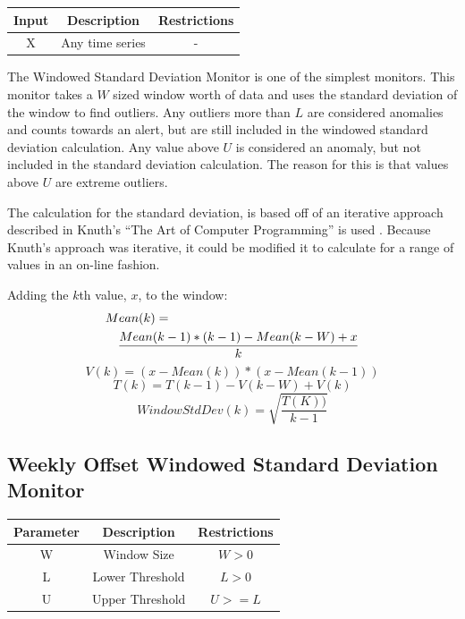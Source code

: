 \documentclass[12pt]{ucthesis}
\begin{document}
\begin{table}[H]
   \begin{center}
      \begin{tabular}{|c|c|c|}
         \hline
            Input & Description & Restrictions \\
         \hline
            X & Any time series & - \\
         \hline
      \end{tabular}
   \end{center}
\end{table}

The Windowed Standard Deviation Monitor is one of the simplest monitors. This monitor takes a $W$ sized window worth of data
and uses the standard deviation of the window to find outliers. Any outliers more than $L$ are considered anomalies and counts towards
an alert, but are still included in the windowed standard deviation calculation. Any value above $U$ is considered an anomaly, but not included
in the standard deviation calculation. The reason for this is that values above $U$ are extreme outliers.

The calculation for the standard deviation, is based off of an iterative approach described in Knuth's ``The Art of Computer Programming'' is used \cite{Knuth}.
Because Knuth's approach was iterative, it could be modified it to calculate for a range of values in an on-line fashion.

Adding the $k$th value, $x$, to the window:
\begin{eqnarray*}
   \lefteqn{Mean(k) = }\\
   && \frac{Mean(k - 1) * (k - 1) - Mean(k - W) + x}{k}
\end{eqnarray*}
$$
   V(k) = (x - Mean(k)) * (x - Mean(k - 1))
$$
$$
   T(k) = T(k - 1) - V(k - W) + V(k)
$$
$$
   WindowStdDev(k) = \sqrt{\frac{T(K))}{k - 1}}
$$

\subsection{Weekly Offset Windowed Standard Deviation Monitor}
\label{outage-detection-monitors-WeeklyWindowStdDev}
\begin{table}[H]
   \begin{center}
      \begin{tabular}{|c|c|c|}
         \hline
            Parameter & Description & Restrictions \\
         \hline
            W & Window Size & $ W > 0 $\\
         \hline
            L & Lower Threshold & $L > 0 $\\
         \hline 
            U & Upper Threshold & $U >= L $\\
         \hline 
      \end{tabular}
   \end{center}
\end{table}
\end{document}
